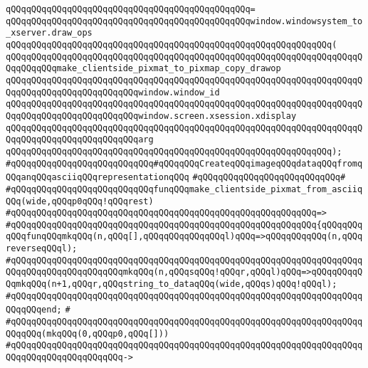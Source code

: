 \verb|qQQqqQQqqQQqqQQqqQQqqQQqqQQqqQQqqQQqqQQqqQQqqQQq=|\newline
\verb|qQQqqQQqqQQqqQQqqQQqqQQqqQQqqQQqqQQqqQQqqQQqqQQqwindow.windowsystem_to_xserver.draw_ops|\newline
\verb|qQQqqQQqqQQqqQQqqQQqqQQqqQQqqQQqqQQqqQQqqQQqqQQqqQQqqQQqqQQqqQQq(|\newline
\verb|qQQqqQQqqQQqqQQqqQQqqQQqqQQqqQQqqQQqqQQqqQQqqQQqqQQqqQQqqQQqqQQqqQQqqQQqqQQqqQQqmake_clientside_pixmat_to_pixmap_copy_drawop|\newline
\verb|qQQqqQQqqQQqqQQqqQQqqQQqqQQqqQQqqQQqqQQqqQQqqQQqqQQqqQQqqQQqqQQqqQQqqQQqqQQqqQQqqQQqqQQqqQQqqQQqwindow.window_id|\newline
\verb|qQQqqQQqqQQqqQQqqQQqqQQqqQQqqQQqqQQqqQQqqQQqqQQqqQQqqQQqqQQqqQQqqQQqqQQqqQQqqQQqqQQqqQQqqQQqqQQqwindow.screen.xsession.xdisplay|\newline
\verb|qQQqqQQqqQQqqQQqqQQqqQQqqQQqqQQqqQQqqQQqqQQqqQQqqQQqqQQqqQQqqQQqqQQqqQQqqQQqqQQqqQQqqQQqqQQqqQQqarg|\newline
\verb|qQQqqQQqqQQqqQQqqQQqqQQqqQQqqQQqqQQqqQQqqQQqqQQqqQQqqQQqqQQqqQQq);|\newline
\newline
\verb|#qQQqqQQqqQQqqQQqqQQqqQQqqQQq#qQQqqQQqCreateqQQqimageqQQqdataqQQqfromqQQqanqQQqasciiqQQqrepresentationqQQq|\newline
\verb|#qQQqqQQqqQQqqQQqqQQqqQQqqQQq#|\newline
\verb|#qQQqqQQqqQQqqQQqqQQqqQQqqQQqfunqQQqmake_clientside_pixmat_from_asciiqQQq(wide,qQQqp0qQQq!qQQqrest)|\newline
\verb|#qQQqqQQqqQQqqQQqqQQqqQQqqQQqqQQqqQQqqQQqqQQqqQQqqQQqqQQqqQQq=>|\newline
\verb|#qQQqqQQqqQQqqQQqqQQqqQQqqQQqqQQqqQQqqQQqqQQqqQQqqQQqqQQqqQQq{qQQqqQQqqQQqfunqQQqmkqQQq(n,qQQq[],qQQqqQQqqQQqqQQql)qQQq=>qQQqqQQqqQQq(n,qQQqreverseqQQql);|\newline
\verb|#qQQqqQQqqQQqqQQqqQQqqQQqqQQqqQQqqQQqqQQqqQQqqQQqqQQqqQQqqQQqqQQqqQQqqQQqqQQqqQQqqQQqqQQqqQQqmkqQQq(n,qQQqsqQQq!qQQqr,qQQql)qQQq=>qQQqqQQqqQQqmkqQQq(n+1,qQQqr,qQQqstring_to_dataqQQq(wide,qQQqs)qQQq!qQQql);|\newline
\verb|#qQQqqQQqqQQqqQQqqQQqqQQqqQQqqQQqqQQqqQQqqQQqqQQqqQQqqQQqqQQqqQQqqQQqqQQqqQQqend;|\newline
\verb|#|\newline
\verb|#qQQqqQQqqQQqqQQqqQQqqQQqqQQqqQQqqQQqqQQqqQQqqQQqqQQqqQQqqQQqqQQqqQQqqQQqqQQq(mkqQQq(0,qQQqp0,qQQq[]))|\newline
\verb|#qQQqqQQqqQQqqQQqqQQqqQQqqQQqqQQqqQQqqQQqqQQqqQQqqQQqqQQqqQQqqQQqqQQqqQQqqQQqqQQqqQQqqQQqqQQq->|\newline
